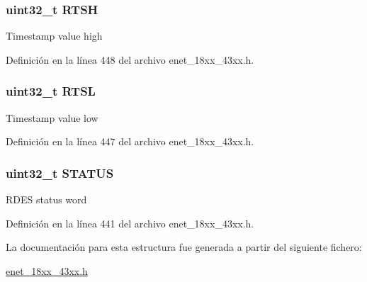 \subsubsection[{\texorpdfstring{R\+T\+SH}{RTSH}}]{ uint32\+\_\+t R\+T\+SH}\hypertarget{struct_e_n_e_t___e_n_h_r_x_d_e_s_c___t_a80c9620ace27791eb31d9708e5253892}{}\label{struct_e_n_e_t___e_n_h_r_x_d_e_s_c___t_a80c9620ace27791eb31d9708e5253892}
Timestamp value high 

Definición en la línea 448 del archivo enet\+\_\+18xx\+\_\+43xx.\+h.

\subsubsection[{\texorpdfstring{R\+T\+SL}{RTSL}}]{ uint32\+\_\+t R\+T\+SL}\hypertarget{struct_e_n_e_t___e_n_h_r_x_d_e_s_c___t_a4cbcdf073b9160af8e58bfec107a74f6}{}\label{struct_e_n_e_t___e_n_h_r_x_d_e_s_c___t_a4cbcdf073b9160af8e58bfec107a74f6}
Timestamp value low 

Definición en la línea 447 del archivo enet\+\_\+18xx\+\_\+43xx.\+h.

\subsubsection[{\texorpdfstring{S\+T\+A\+T\+US}{STATUS}}]{ uint32\+\_\+t S\+T\+A\+T\+US}\hypertarget{struct_e_n_e_t___e_n_h_r_x_d_e_s_c___t_a0b3f4c41f87ca52c3b6bca0bafa0df6b}{}\label{struct_e_n_e_t___e_n_h_r_x_d_e_s_c___t_a0b3f4c41f87ca52c3b6bca0bafa0df6b}
R\+D\+ES status word 

Definición en la línea 441 del archivo enet\+\_\+18xx\+\_\+43xx.\+h.



La documentación para esta estructura fue generada a partir del siguiente fichero\+:\begin{DoxyCompactItemize}
\item 
\hyperlink{enet__18xx__43xx_8h}{enet\+\_\+18xx\+\_\+43xx.\+h}\end{DoxyCompactItemize}
